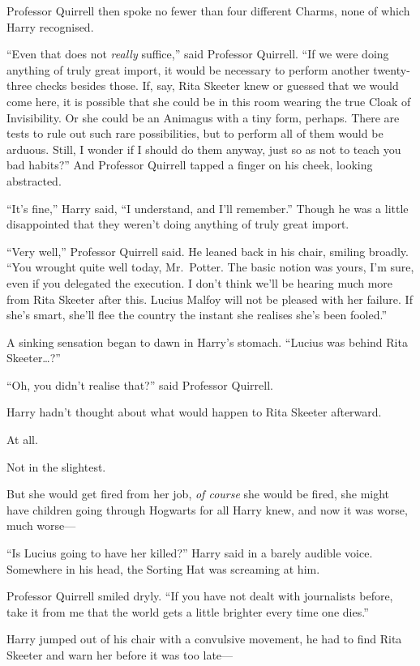 Professor Quirrell then spoke no fewer than four different Charms, none
of which Harry recognised.

``Even that does not \emph{really} suffice,'' said Professor Quirrell.
``If we were doing anything of truly great import, it would be necessary
to perform another twenty-three checks besides those. If, say, Rita
Skeeter knew or guessed that we would come here, it is possible that she
could be in this room wearing the true Cloak of Invisibility. Or she
could be an Animagus with a tiny form, perhaps. There are tests to rule
out such rare possibilities, but to perform all of them would be
arduous. Still, I wonder if I should do them anyway, just so as not to
teach you bad habits?'' And Professor Quirrell tapped a finger on his
cheek, looking abstracted.

``It's fine,'' Harry said, ``I understand, and I'll remember.'' Though
he was a little disappointed that they weren't doing anything of truly
great import.

``Very well,'' Professor Quirrell said. He leaned back in his chair,
smiling broadly. ``You wrought quite well today, Mr.~Potter. The basic
notion was yours, I'm sure, even if you delegated the execution. I don't
think we'll be hearing much more from Rita Skeeter after this. Lucius
Malfoy will not be pleased with her failure. If she's smart, she'll flee
the country the instant she realises she's been fooled.''

A sinking sensation began to dawn in Harry's stomach. ``Lucius was
behind Rita Skeeter\ldots{}?''

``Oh, you didn't realise that?'' said Professor Quirrell.

Harry hadn't thought about what would happen to Rita Skeeter afterward.

At all.

Not in the slightest.

But she would get fired from her job, \emph{of course} she would be
fired, she might have children going through Hogwarts for all Harry
knew, and now it was worse, much worse---

``Is Lucius going to have her killed?'' Harry said in a barely audible
voice. Somewhere in his head, the Sorting Hat was screaming at him.

Professor Quirrell smiled dryly. ``If you have not dealt with
journalists before, take it from me that the world gets a little
brighter every time one dies.''

Harry jumped out of his chair with a convulsive movement, he had to find
Rita Skeeter and warn her before it was too late---


